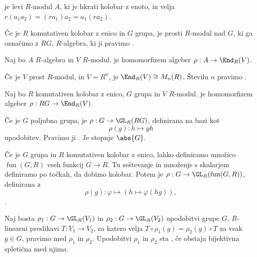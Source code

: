 
\begin{definicija}
   je levi $R$-modul $A$, ki je hkrati kolobar z enoto, in
  velja $r(a_1 a_2) = (r a_1) a_2 = a_1 (r a_2)$.
\end{definicija}

\begin{primer}
  Če je $R$ komutativen kolobar z enico in $G$ grupa, je prosti $R$-modul nad
  $G$, ki ga označimo z $RG$, $R$-algebra, ki ji pravimo .
\end{primer}

\begin{definicija}
  Naj bo $A$ $R$-algebra in $V$ $R$-modul.
   je homomorfizem algeber $\rho: A
  \to \End_R(V)$.
\end{definicija}

\begin{opomba}
  Če je $V$ prost $R$-modul, in $V = R^n$, je $\End_R(V) \cong M_n(R)$.
  Številu $n$ pravimo .
\end{opomba}

\begin{definicija}
  Naj bo $R$ komutativen kolobar z enico, $G$ grupa in $V$ $R$-modul.
   je homomorfizem algeber $\rho: RG
  \to \End_R(V)$.
\end{definicija}

\begin{primer}
  Če je $G$ poljubna grupa, je $\rho: G \to \GL_R(RG)$, definirana na bazi
  kot
  \[
	\rho(g): h \mapsto gh
  \]
  upodobitev.
  Pravimo ji .
  Je stopnje $\abs{G}$.
\end{primer}

\begin{primer}
  Če je $G$ grupa in $R$ komutativen kolobar z enico, lahko definiramo množico
  $\operatorname{fun}(G, R)$ vseh funkcij $G \to R$.
  Tu seštevanje in množenje s skalarjem definiramo po točkah, da dobimo kolobar.
  Potem je $\rho: G \to \GL_R(\operatorname{fun}(G,R))$, definirana z
  \[
	\rho(g): \varphi \mapsto \left( h \mapsto \varphi(hg) \right),
  \]
  .
\end{primer}


\begin{definicija}
  Naj bosta $\rho_1: G \to \GL_R(V_1)$ in $\rho_2: G \to \GL_R(V_2)$ upodobitvi
  grupe $G$.
  $R$-linearni preslikavi $T: V_1 \to V_2$, za katero velja $T \circ \rho_1(g) =
  \rho_2(g) \circ T$ za vsak $g \in G$, pravimo  med $\rho_1$
  in $\rho_2$.
  Upodobitvi $\rho_1$ in $\rho_2$ sta , če obstaja
  bijektivna spletična med njima.
\end{definicija}

